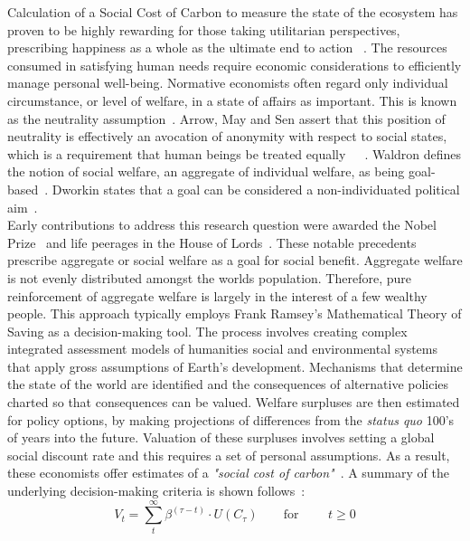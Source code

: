 \documentclass[11pt, oneside]{article}   	%
\begin{document}
Calculation of a Social Cost of Carbon to measure the state of the ecosystem has proven to be highly rewarding for those taking utilitarian perspectives, prescribing happiness as a whole as the ultimate end to action ~\cite{hs1}.
The resources consumed in satisfying human needs require economic considerations to efficiently manage personal well-being.
Normative economists often regard only individual circumstance, or level of  welfare, in a state of affairs as important.
This is known as the neutrality assumption~\cite{pd2}.
Arrow, May and Sen assert that this position of neutrality is effectively an avocation of anonymity with respect to social states, which is a requirement that human beings be treated equally~\cite{ka1}~\cite{km1}~\cite{as2}.
Waldron defines the notion of social welfare, an aggregate of individual welfare, as being goal-based~\cite{jw2}.
Dworkin states that a goal can be considered a non-individuated political aim~\cite{rd1}.\\

Early contributions to address this research question were awarded the Nobel Prize~\cite{np1} and life peerages in the House of Lords~\cite{g1}.
These notable precedents prescribe aggregate or social welfare as a goal for social benefit.
Aggregate welfare is not evenly distributed amongst the worlds population.
Therefore, pure reinforcement of aggregate welfare is largely in the interest of a few wealthy people.
This approach typically employs Frank Ramsey's Mathematical Theory of Saving as a decision-making tool.
The process involves creating complex integrated assessment models of humanities social and environmental systems that apply gross assumptions of Earth's development.
Mechanisms that determine the state of the world are identified and the consequences of alternative policies charted so that consequences can be valued.
Welfare surpluses are then estimated for policy options, by making projections of differences from the \emph{status quo} 100's of years into the future.
Valuation of these surpluses involves setting a global social discount rate and this requires a set of personal assumptions.
As a result, these economists offer estimates of a \emph{"social cost of carbon"}~\cite{pd2}.
A summary of the underlying decision-making criteria is shown follows~\cite{fr1}:\\

\begin{equation}
V_t = \sum_t^\infty \beta^{(\tau - t)} \cdot U (C_\tau)
\qquad \text{for }
\qquad t \geq 0
\end{equation}
\end{document}
